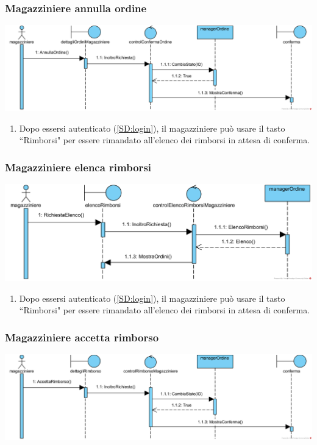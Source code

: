 \documentclass[12pt]{article}
\begin{document}
\subsubsection{Magazziniere annulla ordine}
\label{SD:magazziniereannulla}
\begin{center}
\includegraphics[width=\textwidth]{SequenceDiagram/MagazziniereOrdineAnnulla}
\end{center}

\begin{enumerate}
\item Dopo essersi autenticato (\ref{SD:login}), il magazziniere può usare il tasto ``Rimborsi" per essere rimandato all'elenco dei rimborsi in attesa di conferma.
\end{enumerate}

\subsubsection{Magazziniere elenca rimborsi}
\label{SD:magazziniereelencorimborsi}
\begin{center}
\includegraphics[width=\textwidth]{SequenceDiagram/MagazziniereRimborsoElenco}
\end{center}

\begin{enumerate}
\item Dopo essersi autenticato (\ref{SD:login}), il magazziniere può usare il tasto ``Rimborsi" per essere rimandato all'elenco dei rimborsi in attesa di conferma.
\end{enumerate}

\subsubsection{Magazziniere accetta rimborso}
\label{SD:magazzrimborsook}
\begin{center}
\includegraphics[width=\textwidth]{SequenceDiagram/magazziniereRimborsoAccetta}
\end{center}
\end{document}
